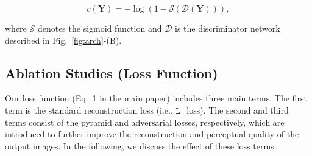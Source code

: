 \documentclass[final]{cvpr}
\begin{document}
\begin{equation}
\label{eq:e_loss}
c\left(\mathbf{Y}\right) = 
-\log\left(1-\mathcal{S}\left(\mathcal{D}\left(\mathbf{Y}\right)\right)\right),
\end{equation}    

\noindent where $\mathcal{S}$ denotes the sigmoid function and $\mathcal{D}$ is the discriminator network described in Fig.\ \ref{fig:arch}-(B). 




\subsection{Ablation Studies (Loss Function)}\label{sec:ablation_study}


Our loss function (Eq.\ 1 in the main paper) includes three main terms. The first term is the standard reconstruction loss (i.e., $\texttt{L}_1$ loss). The second and third terms consist of the pyramid and adversarial losses, respectively, which are introduced to further improve the reconstruction and perceptual quality of the output images. In the following, we discuss the effect of these loss terms.



\begin{table}[t]
\caption{Results of our ablation study on 500 images randomly selected from our validation set. We show the effects of: (i) the pyramid loss, $\mathcal{L}_{\text{pyr}}$, and (ii) the number of Laplacian levels, $n$, in the main network. For each experiment, we show the values of the peak signal-to-noise ratio (PSNR) and structural similarity index measure (SSIM) \cite{wang2004image}. The best PSNR/SSIM values are indicated with bold for each experiment.\vspace{-2mm}}\label{table:ablation}
\end{table}
\end{document}
